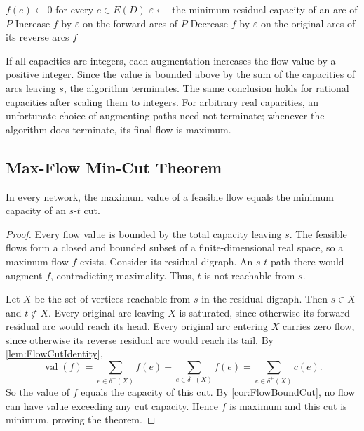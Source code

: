 \begin{algorithm}[H]\caption{Ford--Fulkerson algorithm}\label{alg:FordFulkerson}
\begin{algorithmic}[1]
\State $f(e)\gets 0$ for every $e\in E(D)$
    \State $\varepsilon\gets$ the minimum residual capacity of an arc of $P$
    \State Increase $f$ by $\varepsilon$ on the forward arcs of $P$
    \State Decrease $f$ by $\varepsilon$ on the original arcs of its reverse arcs
\EndWhile
\State \Return $f$
\end{algorithmic}
\end{algorithm}

If all capacities are integers, each augmentation increases the flow value by a positive integer. Since the value is bounded above by the sum of the capacities of arcs leaving $s$, the algorithm terminates. The same conclusion holds for rational capacities after scaling them to integers. For arbitrary real capacities, an unfortunate choice of augmenting paths need not terminate; whenever the algorithm does terminate, its final flow is maximum.

\subsection{Max-Flow Min-Cut Theorem}\label{subsec:MaxFlowMinCut}

\begin{Theorem}\label{thm:MaxFlowMinCut}
In every network, the maximum value of a feasible flow equals the minimum capacity of an $s$-$t$ cut.
\end{Theorem}

\begin{proof}
Every flow value is bounded by the total capacity leaving $s$. The feasible flows form a closed and bounded subset of a finite-dimensional real space, so a maximum flow $f$ exists. Consider its residual digraph. An $s$-$t$ path there would augment $f$, contradicting maximality. Thus, $t$ is not reachable from $s$.

Let $X$ be the set of vertices reachable from $s$ in the residual digraph. Then $s \in X$ and $t \notin X$. Every original arc leaving $X$ is saturated, since otherwise its forward residual arc would reach its head. Every original arc entering $X$ carries zero flow, since otherwise its reverse residual arc would reach its tail. By \cref{lem:FlowCutIdentity},
\begin{equation*}
\operatorname{val}(f) = \sum_{e \in \delta^+(X)}f(e) - \sum_{e \in \delta^-(X)}f(e)
=\sum_{e \in \delta^+(X)}c(e).
\end{equation*}
So the value of $f$ equals the capacity of this cut. By \cref{cor:FlowBoundCut}, no flow can have value exceeding any cut capacity. Hence $f$ is maximum and this cut is minimum, proving the theorem.
\end{proof}

